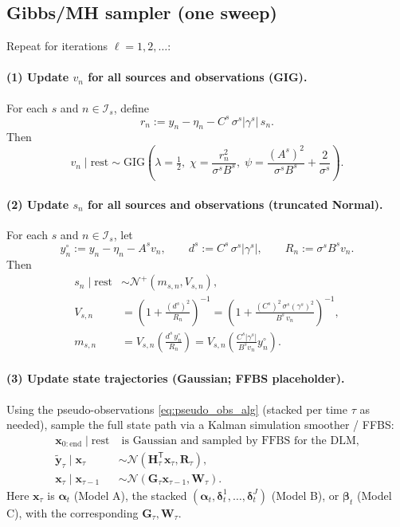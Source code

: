 \documentclass[11pt]{article}
\newcommand{\1}{\mathbb{I}}
\newcommand{\N}{\mathcal{N}}
\newcommand{\GIG}{\mathrm{GIG}}
\newcommand{\T}{\mathsf{T}}
\begin{document}
\subsection{Gibbs/MH sampler (one sweep)}

Repeat for iterations $\ell=1,2,\dots$:

\paragraph{(1) Update $v_n$ for all sources and observations (GIG).}
For each $s$ and $n\in\mathcal{I}_s$, define
\[
r_n := y_n - \eta_n - C^s\,\sigma^s|\gamma^s|\,s_n.
\]
Then
\begin{equation}
v_n \mid \text{rest} \sim \GIG\!\left(\lambda=\tfrac12,\;
\chi=\frac{r_n^2}{\sigma^s B^s},\;
\psi=\frac{(A^s)^2}{\sigma^s B^s}+\frac{2}{\sigma^s}\right).
\label{eq:gibbs_v_alg}
\end{equation}

\paragraph{(2) Update $s_n$ for all sources and observations (truncated Normal).}
For each $s$ and $n\in\mathcal{I}_s$, let
\[
y_n^\circ := y_n - \eta_n - A^s v_n,
\qquad
d^s := C^s\,\sigma^s|\gamma^s|,
\qquad
R_n := \sigma^s B^s v_n.
\]
	Then
	\begin{equation}
	\begin{aligned}
	s_n \mid \text{rest} &\sim \N^+(m_{s,n},V_{s,n}),\\
	V_{s,n}
	&=\left(1+\frac{(d^s)^2}{R_n}\right)^{-1}
	=\left(1+\frac{(C^s)^2\,\sigma^s(\gamma^s)^2}{B^s\,v_n}\right)^{-1},\\
	m_{s,n}
	&=V_{s,n}\left(\frac{d^s\,y_n^\circ}{R_n}\right)
	=V_{s,n}\left(\frac{C^s|\gamma^s|}{B^s v_n}y_n^\circ\right).
	\end{aligned}
	\label{eq:gibbs_s_alg}
	\end{equation}

\paragraph{(3) Update state trajectories (Gaussian; FFBS placeholder).}
Using the pseudo-observations \eqref{eq:pseudo_obs_alg} (stacked per time $\tau$ as needed),
	sample the full state path via a Kalman simulation smoother / FFBS:
	\begin{equation}
	\begin{aligned}
	\bm x_{0:\text{end}} \mid \text{rest}
	&\;\text{is Gaussian and sampled by FFBS for the DLM},\\
	\tilde{\bm y}_\tau \mid \bm x_\tau
	&\sim \N(\bm H_\tau^\T\bm x_\tau,\bm R_\tau),\\
	\bm x_\tau \mid \bm x_{\tau-1}
	&\sim \N(\bm G_\tau \bm x_{\tau-1},\bm W_\tau).
	\end{aligned}
	\label{eq:gibbs_ffbs_placeholder}
	\end{equation}
Here $\bm x_\tau$ is $\bm\alpha_t$ (Model A), the stacked $(\bm\alpha_t,\bm\delta_t^1,\dots,\bm\delta_t^J)$ (Model B),
or $\bm\beta_t$ (Model C), with the corresponding $\bm G_\tau,\bm W_\tau$.
\end{document}
